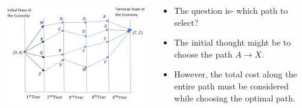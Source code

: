 \documentclass[
  ignorenonframetext,
]{beamer}
\providecommand{\tightlist}{%
  \setlength{\itemsep}{0pt}\setlength{\parskip}{0pt}}\usepackage{longtable,booktabs,array}
\begin{document}
\begin{frame}{}
\label{section}
\begin{columns}[T]
\begin{column}{0.7\textwidth}
\includegraphics[width=4\textwidth,height=\textheight]{images/do_paths.png}
\end{column}

\begin{column}{0.3\textwidth}
\begin{itemize}
\tightlist
\item
  The question is- which path to select?
\item
  The initial thought might be to choose the path \(A \to X\).
\item
  However, the total cost along the entire path must be considered while
  choosing the optimal path.
\end{itemize}
\end{column}
\end{columns}
\end{frame}
\end{document}
